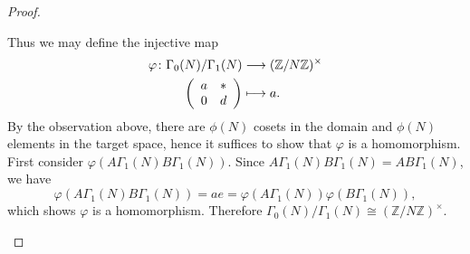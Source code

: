 \documentclass[10pt]{amsart}
\begin{document}
\begin{thm}
\begin{proof}
\begin{enumerate}[(a)]
      Thus we may define the injective map 
      \begin{align*}
        \varphi \colon \Gamma_0(N) / \Gamma_1(N) &\longrightarrow (\mathbb{Z}/N\mathbb{Z})^{\times}\\
        \left(
      \begin{array}{cc}
	a & *\\
	0 & d
      \end{array}
      \right) & \longmapsto a.
      \end{align*}
      By the observation above, there are $\phi(N)$ cosets in the domain and $\phi(N)$ elements in the target space, hence it suffices to show that $\varphi$ is a homomorphism.
      First consider $\varphi(A\Gamma_1(N)B\Gamma_1(N))$.
      Since $A\Gamma_1(N)B\Gamma_1(N) = AB\Gamma_1(N)$, we have $$\varphi(A\Gamma_1(N)B\Gamma_1(N)) = ae = \varphi(A\Gamma_1(N))\varphi(B\Gamma_1(N)),$$
      which shows $\varphi$ is a homomorphism.
      Therefore $\Gamma_0(N) / \Gamma_1(N) \cong (\mathbb{Z}/N\mathbb{Z})^{\times}$.
      

\end{enumerate}
\end{proof}
\end{thm}
\end{document}
